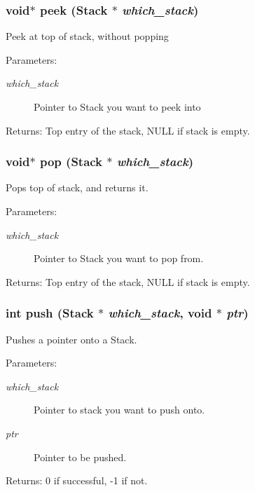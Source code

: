 \subsubsection{\setlength{\rightskip}{0pt plus 5cm}void$\ast$ peek (\bf{Stack} $\ast$ {\em which\_\-stack})}\label{stack_8h_75f168a88a2f0eb5054b9eb571b3dd77}


Peek at top of stack, without popping \begin{Desc}
\item[Parameters:]
\begin{description}
\item[{\em which\_\-stack}]Pointer to Stack you want to peek into \end{description}
\end{Desc}
\begin{Desc}
\item[Returns:]Top entry of the stack, NULL if stack is empty. \end{Desc}
\subsubsection{\setlength{\rightskip}{0pt plus 5cm}void$\ast$ pop (\bf{Stack} $\ast$ {\em which\_\-stack})}\label{stack_8h_d02fd402bed8958596a341fbef57f0a7}


Pops top of stack, and returns it. \begin{Desc}
\item[Parameters:]
\begin{description}
\item[{\em which\_\-stack}]Pointer to Stack you want to pop from. \end{description}
\end{Desc}
\begin{Desc}
\item[Returns:]Top entry of the stack, NULL if stack is empty. \end{Desc}
\subsubsection{\setlength{\rightskip}{0pt plus 5cm}int push (\bf{Stack} $\ast$ {\em which\_\-stack}, void $\ast$ {\em ptr})}\label{stack_8h_006917f7e90d844cb8b0f14beee2d699}


Pushes a pointer onto a Stack. \begin{Desc}
\item[Parameters:]
\begin{description}
\item[{\em which\_\-stack}]Pointer to stack you want to push onto. \item[{\em ptr}]Pointer to be pushed. \end{description}
\end{Desc}
\begin{Desc}
\item[Returns:]0 if successful, -1 if not. \end{Desc}
